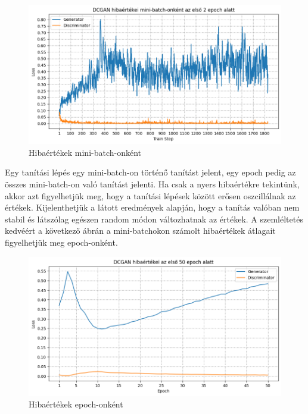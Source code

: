\begin{figure}[h]
\centering
\includegraphics[width=15cm]{images/miniloss.png}
\caption{Hibaértékek mini-batch-onként}
\label{fig:mini-batch_loss_plot}
\end{figure}

Egy tanítási lépés egy mini-batch-on történő tanítást jelent, egy epoch pedig az összes mini-batch-on való tanítást jelenti.
Ha csak a nyers hibaértékre tekintünk, akkor azt figyelhetjük meg, hogy a tanítási lépések között erősen oszcillálnak az értékek. Kijelenthetjük a látott eredmények alapján, hogy a tanítás valóban nem stabil és látszólag egészen random módon változhatnak az értékek.
A szemléltetés kedvéért a következő ábrán a mini-batchokon számolt hibaértékek átlagait figyelhetjük meg epoch-onként.

\begin{figure}[h]
\centering
\includegraphics[width=15cm]{images/epochloss.png}
\caption{Hibaértékek epoch-onként}
\label{fig:epoch_loss_plot}
\end{figure}


